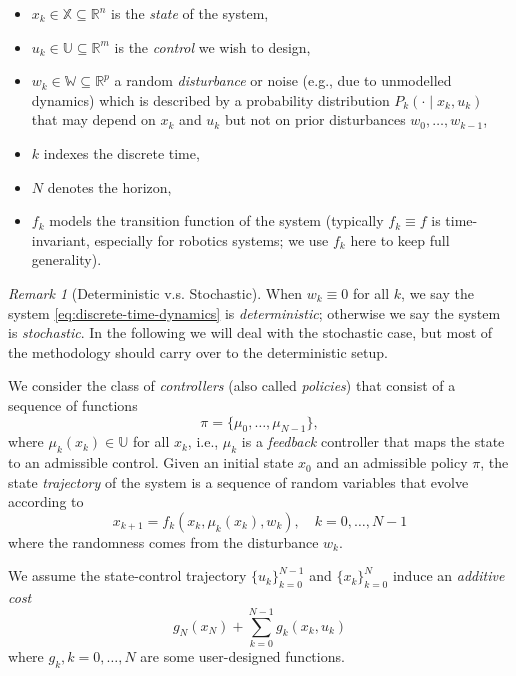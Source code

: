 \documentclass[
]{book}
\theoremstyle{definition}
\theoremstyle{definition}
\theoremstyle{definition}
\theoremstyle{definition}
\theoremstyle{remark}
\newtheorem*{remark}{Remark}
\begin{document}
\begin{itemize}
\item
  \(x_k \in \mathbb{X} \subseteq \mathbb{R}^n\) is the \emph{state} of the system,
\item
  \(u_k \in \mathbb{U} \subseteq \mathbb{R}^m\) is the \emph{control} we wish to design,
\item
  \(w_k \in \mathbb{W} \subseteq \mathbb{R}^p\) a random \emph{disturbance} or noise (e.g., due to unmodelled dynamics) which is described by a probability distribution \(P_k(\cdot \mid x_k, u_k)\) that may depend on \(x_k\) and \(u_k\) but not on prior disturbances \(w_0,\dots,w_{k-1}\),
\item
  \(k\) indexes the discrete time,
\item
  \(N\) denotes the horizon,
\item
  \(f_k\) models the transition function of the system (typically \(f_k \equiv f\) is time-invariant, especially for robotics systems; we use \(f_k\) here to keep full generality).
\end{itemize}

\begin{remark}[Deterministic v.s. Stochastic]
When \(w_k \equiv 0\) for all \(k\), we say the system \eqref{eq:discrete-time-dynamics} is \emph{deterministic}; otherwise we say the system is \emph{stochastic}. In the following we will deal with the stochastic case, but most of the methodology should carry over to the deterministic setup.
\end{remark}

We consider the class of \emph{controllers} (also called \emph{policies}) that consist of a sequence of functions
\[
\pi = \{ \mu_0,\dots,\mu_{N-1} \},
\]
where \(\mu_k (x_k) \in \mathbb{U}\) for all \(x_k\), i.e., \(\mu_k\) is a \emph{feedback} controller that maps the state to an admissible control. Given an initial state \(x_0\) and an admissible policy \(\pi\), the state \emph{trajectory} of the system is a sequence of random variables that evolve according to
\begin{equation}
x_{k+1} = f_k(x_k,\mu_k(x_k),w_k), \quad k=0,\dots,N-1
\label{eq:closed-loop-state-trajectory}
\end{equation}
where the randomness comes from the disturbance \(w_k\).

We assume the state-control trajectory \(\{u_k\}_{k=0}^{N-1}\) and \(\{x_k \}_{k=0}^{N}\) induce an \emph{additive cost}
\begin{equation}
g_N(x_N) + \sum_{k=0}^{N-1} g_k(x_k,u_k)
\label{eq:additive-cost}
\end{equation}
where \(g_k,k=0,\dots,N\) are some user-designed functions.
\end{document}
